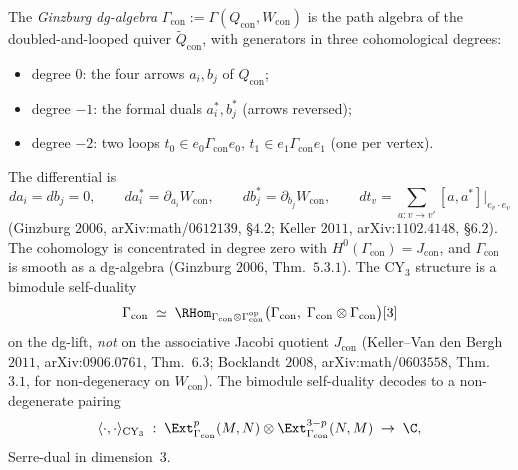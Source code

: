 \begin{definition}
\label{def:kw-ginzburg-dg}
The \emph{Ginzburg dg-algebra} $\Gamma_{\mathrm{con}} := \Gamma(Q_{\mathrm{con}}, W_{\mathrm{con}})$ is the path algebra of the doubled-and-looped quiver $\widetilde Q_{\mathrm{con}}$, with generators in three cohomological degrees:
\begin{itemize}
 \item degree $0$: the four arrows $a_i, b_j$ of $Q_{\mathrm{con}}$;
 \item degree $-1$: the formal duals $a_i^*, b_j^*$ (arrows reversed);
 \item degree $-2$: two loops $t_0 \in e_0 \Gamma_{\mathrm{con}} e_0$, $t_1 \in e_1 \Gamma_{\mathrm{con}} e_1$ (one per vertex).
\end{itemize}
The differential is
\[
 d a_i = d b_j = 0, \qquad d a_i^* = \partial_{a_i} W_{\mathrm{con}}, \qquad d b_j^* = \partial_{b_j} W_{\mathrm{con}}, \qquad d t_v = \sum_{a : v \to v'} [a, a^*] \bigl|_{e_v \cdot e_v}
\]
(Ginzburg $2006$, arXiv:math/$0612139$, §$4.2$; Keller $2011$, arXiv:$1102.4148$, §$6.2$). The cohomology is concentrated in degree zero with $H^0(\Gamma_{\mathrm{con}}) = J_{\mathrm{con}}$, and $\Gamma_{\mathrm{con}}$ is smooth as a dg-algebra (Ginzburg $2006$, Thm.~$5.3.1$). The CY$_3$ structure is a bimodule self-duality
\[
 \Gamma_{\mathrm{con}} \;\simeq\; \RHom_{\Gamma_{\mathrm{con}} \otimes \Gamma_{\mathrm{con}}^{\mathrm{op}}}\bigl(\Gamma_{\mathrm{con}}, \; \Gamma_{\mathrm{con}} \otimes \Gamma_{\mathrm{con}}\bigr)[3]
\]
on the dg-lift, \emph{not} on the associative Jacobi quotient $J_{\mathrm{con}}$ (Keller--Van den Bergh $2011$, arXiv:$0906.0761$, Thm.~$6.3$; Bocklandt $2008$, arXiv:math/$0603558$, Thm.~$3.1$, for non-degeneracy on $W_{\mathrm{con}}$). The bimodule self-duality decodes to a non-degenerate pairing
\[
 \langle \cdot, \cdot \rangle_{\mathrm{CY}_3} \;:\; \Ext^p_{\Gamma_{\mathrm{con}}}(M, N) \otimes \Ext^{3-p}_{\Gamma_{\mathrm{con}}}(N, M) \;\to\; \C,
\]
Serre-dual in dimension~$3$.
\end{definition}

